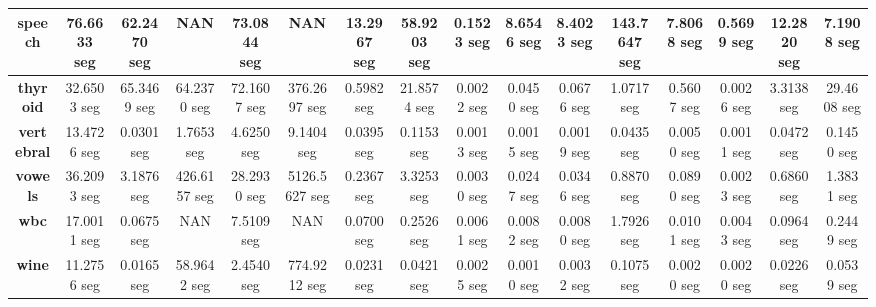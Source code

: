 \begin{table}[H]
{\begin{tabular}{|c|c|c|c|c|c|c|c|c|c|c|c|c|c|c|c|}
		\textbf{speech}           & 76.6633 seg      & 62.2470 seg   & NAN             & 73.0844 seg   & NAN           & 13.2967 seg   & 58.9203 seg  & 0.1523 seg    & 8.6546 seg   & 8.4023 seg   & 143.7647 seg & 7.8068 seg     & 0.5699 seg   & 12.2820 seg  & 7.1908 seg    \\ \hline
		\textbf{thyroid}          & 32.6503 seg      & 65.3469 seg   & 64.2370 seg     & 72.1607 seg   & 376.2697 seg  & 0.5982 seg    & 21.8574 seg  & 0.0022 seg    & 0.0450 seg   & 0.0676 seg   & 1.0717 seg   & 0.5607 seg     & 0.0026 seg   & 3.3138 seg   & 29.4608 seg   \\ \hline
		\textbf{vertebral}        & 13.4726 seg      & 0.0301 seg    & 1.7653 seg      & 4.6250 seg    & 9.1404 seg    & 0.0395 seg    & 0.1153 seg   & 0.0013 seg    & 0.0015 seg   & 0.0019 seg   & 0.0435 seg   & 0.0050 seg     & 0.0011 seg   & 0.0472 seg   & 0.1450 seg    \\ \hline
		\textbf{vowels}           & 36.2093 seg      & 3.1876 seg    & 426.6157 seg    & 28.2930 seg   & 5126.5627 seg & 0.2367 seg    & 3.3253 seg   & 0.0030 seg    & 0.0247 seg   & 0.0346 seg   & 0.8870 seg   & 0.0890 seg     & 0.0023 seg   & 0.6860 seg   & 1.3831 seg    \\ \hline
		\textbf{wbc}              & 17.0011 seg      & 0.0675 seg    & NAN             & 7.5109 seg    & NAN           & 0.0700 seg    & 0.2526 seg   & 0.0061 seg    & 0.0082 seg   & 0.0080 seg   & 1.7926 seg   & 0.0101 seg     & 0.0043 seg   & 0.0964 seg   & 0.2449 seg    \\ \hline
		\textbf{wine}             & 11.2756 seg      & 0.0165 seg    & 58.9642 seg     & 2.4540 seg    & 774.9212 seg  & 0.0231 seg    & 0.0421 seg   & 0.0025 seg    & 0.0010 seg   & 0.0032 seg   & 0.1075 seg   & 0.0020 seg     & 0.0020 seg   & 0.0226 seg   & 0.0539 seg    \\ \hline
	\end{tabular}
}
\end{table}